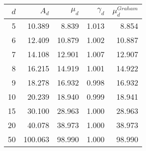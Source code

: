 \begin{tabular}{rrrrr}
\toprule
 $d$ &    $A_d$ &  $\mu_d$ &  $\gamma_d$ &  $\mu_d^{Graham}$ \\
\midrule
   5 &   10.389 &    8.839 &       1.013 &             8.854 \\
   6 &   12.409 &   10.879 &       1.002 &            10.887 \\
   7 &   14.108 &   12.901 &       1.007 &            12.907 \\
   8 &   16.215 &   14.919 &       1.001 &            14.922 \\
   9 &   18.278 &   16.932 &       0.998 &            16.932 \\
  10 &   20.239 &   18.940 &       0.999 &            18.941 \\
  15 &   30.100 &   28.963 &       1.000 &            28.963 \\
  20 &   40.078 &   38.973 &       1.000 &            38.973 \\
  50 &  100.063 &   98.990 &       1.000 &            98.990 \\
\bottomrule
\end{tabular}
